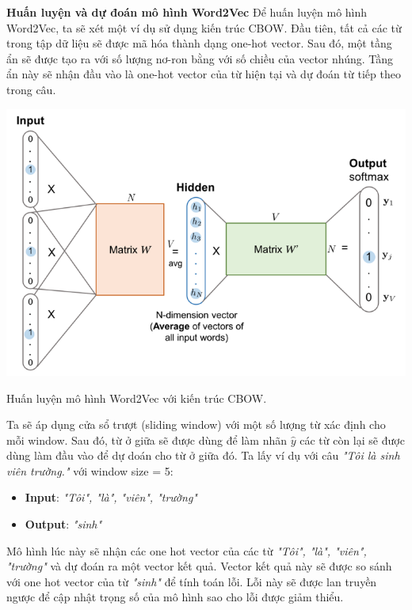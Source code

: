 \documentclass[a4paper, 12pt, openany]{book}
\begin{document}
\textbf{Huấn luyện và dự đoán mô hình Word2Vec}
Để huấn luyện mô hình Word2Vec, ta sẽ xét một ví dụ sử dụng kiến trúc CBOW.
Đầu tiên, tất cả các từ trong tập dữ liệu sẽ được mã hóa thành dạng one-hot vector. Sau đó, một tầng ẩn sẽ được tạo ra với số lượng nơ-ron bằng với số chiều của vector nhúng. Tầng ẩn này sẽ nhận đầu vào là one-hot vector của từ hiện tại và dự đoán từ tiếp theo trong câu.

\begin{minipage}{\linewidth}
    \captionsetup{type=figure}
    \centering
    \includegraphics[width=\linewidth]{./assets/images/cbow.png}
    \caption{Huấn luyện mô hình Word2Vec với kiến trúc CBOW.}
\end{minipage}
\vspace{0.5cm}

Ta sẽ áp dụng cửa sổ trượt (sliding window) với một số lượng từ xác định cho mỗi window. Sau đó, từ ở giữa sẽ được dùng để làm nhãn \(\hat{y}\)
các từ còn lại sẽ được dùng làm đầu vào để dự doán cho từ ở giữa đó. Ta lấy ví dụ với câu \textit{"Tôi là sinh viên trường."} với window size = 5:

\begin{itemize}
    \item \textbf{Input}: \textit{"Tôi", "là", "viên", "trường"}
    \item \textbf{Output}: \textit{"sinh"}
\end{itemize}

Mô hình lúc này sẽ nhận các one hot vector của các từ \textit{"Tôi", "là", "viên", "trường"} và dự đoán ra một vector kết quả.
Vector kết quả này sẽ được so sánh với one hot vector của từ \textit{"sinh"} để tính toán lỗi. 
Lỗi này sẽ được lan truyền ngược để cập nhật trọng số của mô hình sao cho lỗi được giảm thiểu.
\end{document}
